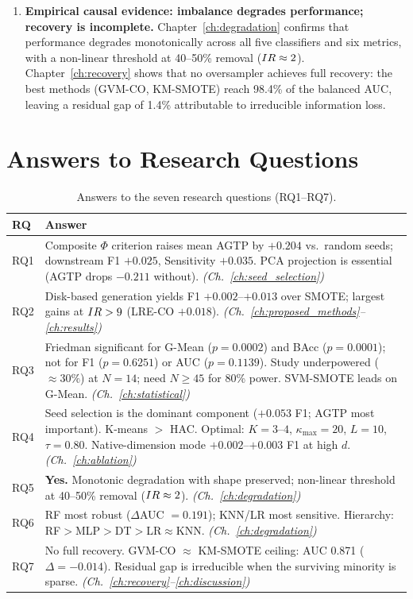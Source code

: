 \begin{enumerate}[label=\textbf{C\arabic*.}, leftmargin=*, itemsep=6pt]
  \item \textbf{Empirical causal evidence: imbalance degrades performance; recovery is incomplete.}
  Chapter~\ref{ch:degradation} confirms that performance degrades monotonically across all five classifiers and six metrics, with a non-linear threshold at 40--50\% removal ($IR \approx 2$).
  Chapter~\ref{ch:recovery} shows that no oversampler achieves full recovery: the best methods (GVM-CO, KM-SMOTE) reach 98.4\% of the balanced AUC, leaving a residual gap of 1.4\% attributable to irreducible information loss.

\end{enumerate}


\section{Answers to Research Questions}
\label{sec:conc:rqs}

\begin{table}[ht]
\centering
\caption{Answers to the seven research questions (RQ1--RQ7).}
\label{tab:conc:rqs}
\small
\begin{tabular}{@{}p{0.7cm}p{12.5cm}@{}}
\toprule
\textbf{RQ} & \textbf{Answer} \\
\midrule
RQ1 & Composite $\Phi$ criterion raises mean AGTP by $+0.204$ vs.\ random seeds; downstream F1 $+0.025$, Sensitivity $+0.035$. PCA projection is essential (AGTP drops $-0.211$ without). \emph{(Ch.~\ref{ch:seed_selection})} \\[3pt]
RQ2 & Disk-based generation yields F1 $+0.002$--$+0.013$ over SMOTE; largest gains at $IR>9$ (LRE-CO $+0.018$). \emph{(Ch.~\ref{ch:proposed_methods}--\ref{ch:results})} \\[3pt]
RQ3 & Friedman significant for G-Mean ($p=0.0002$) and BAcc ($p=0.0001$); not for F1 ($p=0.6251$) or AUC ($p=0.1139$). Study underpowered ($\approx30\%$) at $N=14$; need $N\geq45$ for 80\% power. SVM-SMOTE leads on G-Mean. \emph{(Ch.~\ref{ch:statistical})} \\[3pt]
RQ4 & Seed selection is the dominant component ($+0.053$ F1; AGTP most important). K-means $>$ HAC. Optimal: $K=3$--$4$, $\kappa_{\max}=20$, $L=10$, $\tau=0.80$. Native-dimension mode $+0.002$--$+0.003$ F1 at high $d$. \emph{(Ch.~\ref{ch:ablation})} \\[3pt]
RQ5 & \textbf{Yes.} Monotonic degradation with shape preserved; non-linear threshold at 40--50\% removal ($IR\approx2$). \emph{(Ch.~\ref{ch:degradation})} \\[3pt]
RQ6 & RF most robust ($\Delta$AUC $=0.191$); KNN/LR most sensitive. Hierarchy: RF$>$MLP$>$DT$>$LR$\approx$KNN. \emph{(Ch.~\ref{ch:degradation})} \\[3pt]
RQ7 & No full recovery. GVM-CO $\approx$ KM-SMOTE ceiling: AUC 0.871 ($\Delta=-0.014$). Residual gap is irreducible when the surviving minority is sparse. \emph{(Ch.~\ref{ch:recovery}--\ref{ch:discussion})} \\
\bottomrule
\end{tabular}
\end{table}


